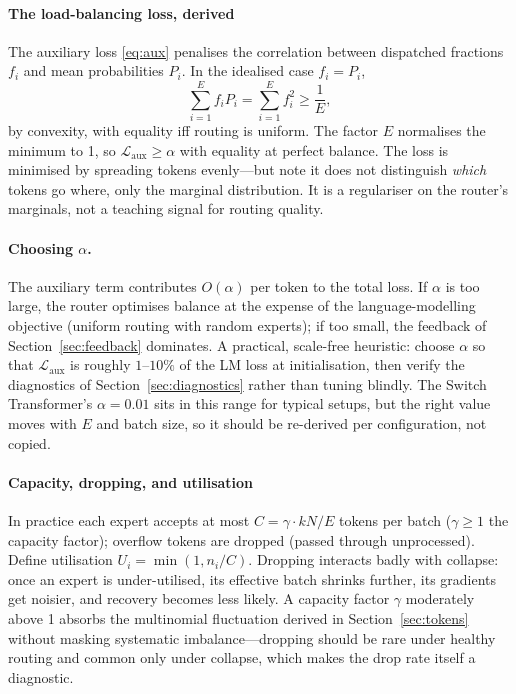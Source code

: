 \paragraph{The load-balancing loss, derived}
\label{sec:aux}

The auxiliary loss \eqref{eq:aux} penalises the correlation between
dispatched fractions $f_i$ and mean probabilities $P_i$. In the
idealised case $f_i = P_i$,
\begin{equation}
  \sum_{i=1}^E f_i P_i = \sum_{i=1}^E f_i^2 \geq \frac{1}{E},
\end{equation}
by convexity, with equality iff routing is uniform. The factor $E$
normalises the minimum to 1, so $\mathcal{L}_{\mathrm{aux}} \geq
\alpha$ with equality at perfect balance. The loss is minimised by
spreading tokens evenly---but note it does not distinguish
\emph{which} tokens go where, only the marginal distribution. It is
a regulariser on the router's marginals, not a teaching signal for
routing quality.

\paragraph{Choosing $\alpha$.} The auxiliary term contributes
$O(\alpha)$ per token to the total loss. If $\alpha$ is too large,
the router optimises balance at the expense of the language-modelling
objective (uniform routing with random experts); if too small, the
feedback of Section~\ref{sec:feedback} dominates. A practical,
scale-free heuristic: choose $\alpha$ so that
$\mathcal{L}_{\mathrm{aux}}$ is roughly $1$--$10\%$ of the LM loss at
initialisation, then verify the diagnostics of
Section~\ref{sec:diagnostics} rather than tuning blindly. The Switch
Transformer's $\alpha = 0.01$ \citep{fedus2022switch} sits in this
range for typical setups, but the right value moves with $E$ and
batch size, so it should be re-derived per configuration, not copied.

\paragraph{Capacity, dropping, and utilisation}
\label{sec:capacity}

In practice each expert accepts at most
$C = \gamma \cdot kN/E$ tokens per batch ($\gamma \geq 1$ the
capacity factor); overflow tokens are dropped (passed through
unprocessed). Define utilisation $U_i = \min(1, n_i / C)$.
Dropping interacts badly with collapse: once an expert is
under-utilised, its effective batch shrinks further, its gradients
get noisier, and recovery becomes less likely. A capacity factor
$\gamma$ moderately above 1 absorbs the multinomial fluctuation
derived in Section~\ref{sec:tokens} without masking systematic
imbalance---dropping should be rare under healthy routing and common
only under collapse, which makes the drop rate itself a diagnostic.

